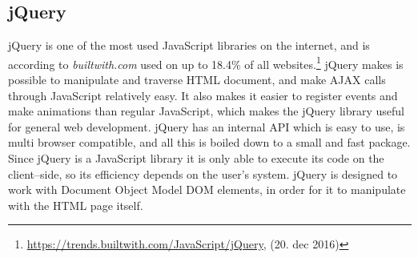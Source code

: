 \subsection{jQuery} \label{ssec:jquery}
jQuery is one of the most used JavaScript libraries on the internet, and is according to \textit{builtwith.com} used on up to 18.4\% of all websites.\footnote{\url{https://trends.builtwith.com/JavaScript/jQuery}, (20. dec 2016)}
jQuery makes is possible to manipulate and traverse HTML document, and make \ac{AJAX} calls through JavaScript relatively easy.
It also makes it easier to register events and make animations than regular JavaScript, which makes the jQuery library useful for general web development.
jQuery has an internal API which is easy to use, is multi browser compatible, and all this is boiled down to a small and fast package.
Since jQuery is a JavaScript library it is only able to execute its code on the client--side, so its efficiency depends on the user's system.
jQuery is designed to work with Document Object Model \ac{DOM} elements, in order for it to manipulate with the HTML page itself.

